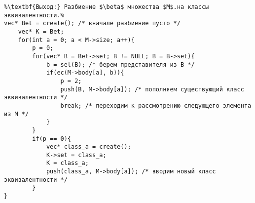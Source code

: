 \begin{lstlisting}[escapechar=\%]
%\noindent\textbf{Вход:} множество $M$, отношение эквивалентности $\equiv$ на $M$.\\%
%\textbf{Выход:} Разбиение $\beta$ множества $M$.на классы эквивалентности.%
vec* Bet = create(); /* вначале разбиение пусто */
	vec* K = Bet;
	for(int a = 0; a < M->size; a++){
		p = 0;
		for(vec* B = Bet->set; B != NULL; B = B->set){
			b = sel(B); /* берем представителя из B */
			if(ec(M->body[a], b)){
				p = 2;
				push(B, M->body[a]); /* пополняем существующий класс эквивалентности */
				break; /* переходим к рассмотрению следующего элемента из М */
			}
		}
		if(p == 0){
			vec* class_a = create();
			K->set = class_a;
			K = class_a;
			push(class_a, M->body[a]); /* вводим новый класс эквивалентности */
		}
}
\end{lstlisting}
